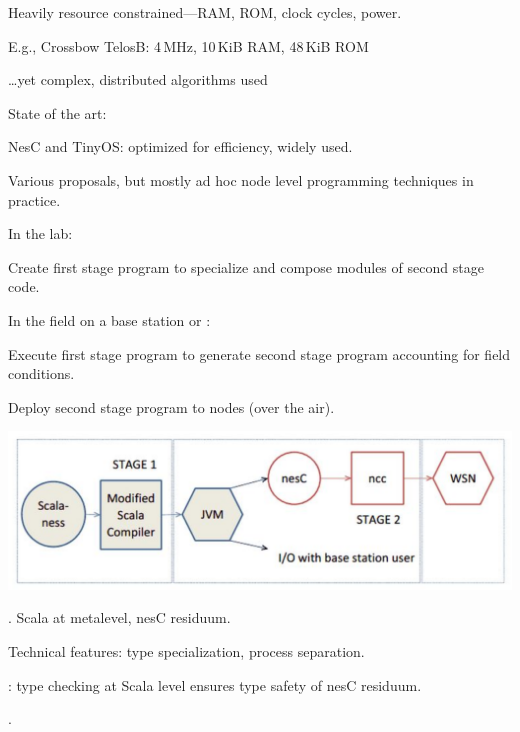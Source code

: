 
\begin{citemize}
\item Heavily resource constrained---RAM, ROM, clock cycles, power.
\item E.g., Crossbow TelosB: 4\,MHz, 10\,KiB RAM, 48\,KiB ROM
\item \ldots yet complex, distributed algorithms used
\end{citemize}

State of the art:
\begin{citemize}
\item NesC and TinyOS: optimized for efficiency, widely used.
\item Various  proposals, but mostly ad hoc node level programming
  techniques in practice.
\end{citemize}
\stopslide


In the lab:
\begin{citemize}
\item Create first stage program to specialize and compose modules of second stage code.
\end{citemize}

In the field on a base station or :
\begin{citemize}
\item Execute first stage program to generate second stage program accounting for field
  conditions.
\item Deploy second stage program to nodes (over the air).
\end{citemize}
\stopslide


\hspace*{.6in}\includegraphics{scalaness}
\stopslide


\begin{citemize}
\item {}. Scala at metalevel, nesC residuum.
\item Technical features: type specialization, process separation.
\item {}: type checking at Scala level ensures type safety of nesC
  residuum.
\item {}.
\end{citemize}
\stopslide

